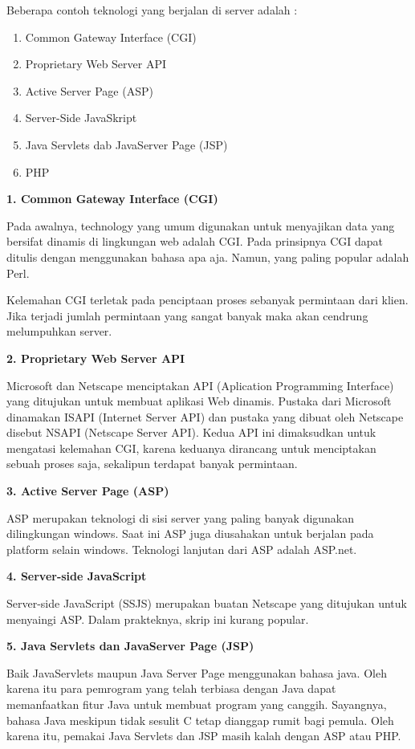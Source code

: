 \documentclass[11pt]{article}
\begin{document}
Beberapa contoh teknologi yang berjalan di server adalah :

\begin{enumerate}
	\item Common Gateway Interface (CGI)
	\item Proprietary Web Server API
	\item Active Server Page (ASP)
	\item Server-Side JavaSkript
	\item Java Servlets dab JavaServer Page (JSP)
	\item PHP
\end{enumerate}

\textbf{1. Common Gateway Interface (CGI)}

Pada awalnya, technology yang umum digunakan untuk menyajikan data yang bersifat dinamis di lingkungan web adalah CGI. Pada prinsipnya CGI dapat ditulis dengan menggunakan bahasa apa aja. Namun, yang paling popular adalah Perl.

Kelemahan CGI terletak pada penciptaan proses sebanyak permintaan dari klien. Jika terjadi jumlah permintaan yang sangat banyak maka akan cendrung melumpuhkan server.

\textbf{2. Proprietary Web Server API}

Microsoft dan Netscape menciptakan API (Aplication Programming Interface) yang ditujukan untuk membuat aplikasi Web dinamis. Pustaka dari Microsoft dinamakan ISAPI (Internet Server API) dan pustaka yang dibuat oleh Netscape disebut NSAPI (Netscape Server API). Kedua API ini dimaksudkan untuk mengatasi kelemahan CGI, karena keduanya dirancang untuk menciptakan sebuah proses saja, sekalipun terdapat banyak permintaan.

\textbf{3. Active Server Page (ASP)}

ASP merupakan teknologi di sisi server yang paling banyak digunakan dilingkungan windows. Saat ini ASP juga diusahakan untuk berjalan pada platform selain windows. Teknologi lanjutan dari ASP adalah ASP.net.

\textbf{4. Server-side JavaScript}

Server-side JavaScript (SSJS) merupakan buatan Netscape yang ditujukan untuk menyaingi ASP. Dalam prakteknya, skrip ini kurang popular.

\textbf{5. Java Servlets dan JavaServer Page (JSP)}

Baik JavaServlets maupun Java Server Page menggunakan bahasa java. Oleh karena itu para pemrogram yang telah terbiasa dengan Java dapat memanfaatkan fitur Java untuk membuat program yang canggih. Sayangnya, bahasa Java meskipun tidak sesulit C tetap dianggap rumit bagi pemula. Oleh karena itu, pemakai Java Servlets dan JSP masih kalah dengan ASP atau PHP.
\end{document}
